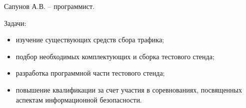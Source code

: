 Сапунов А.В. -- программист.\par
Задачи:
\begin{itemize}
\item изучение существующих средств сбора трафика;
\item подбор необходимых комплектующих и сборка тестового стенда;
\item разработка программной части тестового стенда;
\item повышение квалификации за счет участия в соревнованиях, посвященных аспектам информационной безопасности.
\end{itemize}

\clearpage

